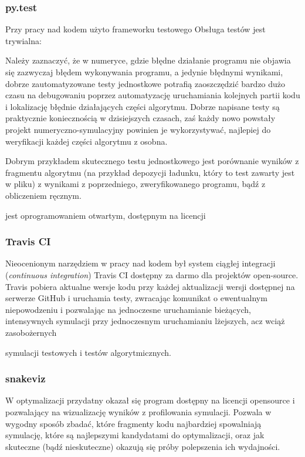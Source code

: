     \subsubsection{py.test}
    Przy pracy nad kodem użyto frameworku testowego 
     Obsługa testów jest trywialna:



    Należy zaznaczyć, że w numeryce, gdzie błędne działanie programu nie
    objawia się zazwyczaj błędem wykonywania programu, a jedynie błędnymi
    wynikami, dobrze zautomatyzowane testy jednostkowe potrafią zaoszczędzić
    bardzo dużo czasu na debugowaniu poprzez automatyzację uruchamiania
    kolejnych partii kodu i lokalizację błędnie działających części algorytmu.
    Dobrze napisane testy są praktycznie koniecznością w dzisiejszych czasach,
    zaś każdy nowo powstały projekt numeryczno-symulacyjny powinien je
    wykorzystywać, najlepiej do weryfikacji każdej części algorytmu z osobna.

    Dobrym przykładem skutecznego testu jednostkowego jest porównanie wyników z
    fragmentu algorytmu (na przykład depozycji ładunku, który to test zawarty
    jest w pliku) 
     z wynikami z poprzedniego, zweryfikowanego
    programu, bądź z obliczeniem ręcznym.

     jest oprogramowaniem otwartym, dostępnym na licencji


    \subsubsection{Travis CI}
    Nieocenionym narzędziem w pracy nad kodem był system ciągłej integracji
    (\emph{continuous integration}) Travis CI 
     dostępny za
    darmo dla projektów open-source. Travis pobiera aktualne wersje kodu przy
    każdej aktualizacji wersji dostępnej na serwerze GitHub i uruchamia testy,
    zwracając komunikat o ewentualnym niepowodzeniu i pozwalając na jednoczesne
    uruchamianie bieżących, intensywnych symulacji przy jednoczesnym
    uruchamianiu lżejszych, acz wciąż zasobożernych 

    symulacji testowych i testów algorytmicznych.

    \subsubsection{snakeviz}

    W optymalizacji przydatny okazał się program  dostępny na
    licencji opensource i pozwalający na wizualizację wyników z profilowania
    symulacji. Pozwala w wygodny sposób zbadać, które fragmenty kodu najbardziej
    spowalniają symulację, które są najlepszymi kandydatami do optymalizacji, oraz
    jak skuteczne (bądź nieskuteczne) okazują się próby polepszenia ich wydajności.
